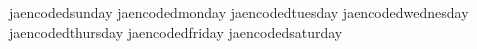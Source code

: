    jaencodedsunday        {}
   jaencodedmonday        {}
   jaencodedtuesday       {}
   jaencodedwednesday     {}
   jaencodedthursday      {}
   jaencodedfriday        {}
   jaencodedsaturday      {}

\stopencoding

\protect \endinput
